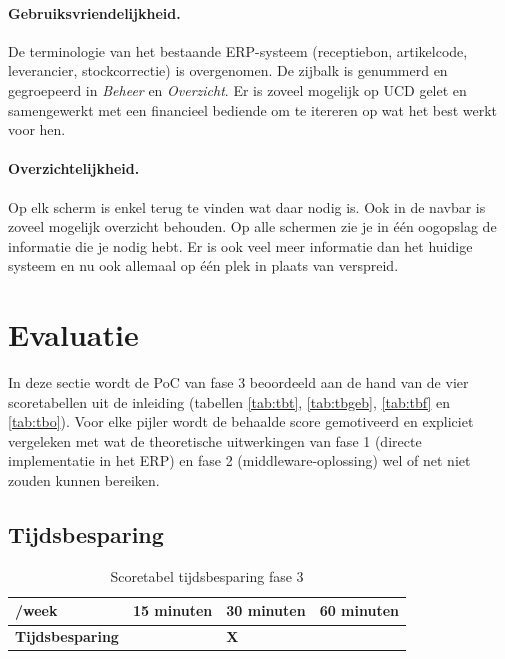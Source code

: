 \paragraph{Gebruiksvriendelijkheid.} De terminologie van het bestaande ERP-systeem (receptiebon, artikelcode, leverancier, stockcorrectie) is overgenomen. De zijbalk is genummerd en gegroepeerd in \textit{Beheer} en \textit{Overzicht}. Er is zoveel mogelijk op UCD gelet en samengewerkt met een financieel bediende om te itereren op wat het best werkt voor hen.

\paragraph{Overzichtelijkheid.} Op elk scherm is enkel terug te vinden wat daar nodig is. Ook in de navbar is zoveel mogelijk overzicht behouden. Op alle schermen zie je in één oogopslag de informatie die je nodig hebt. Er is ook veel meer informatie dan het huidige systeem en nu ook allemaal op één plek in plaats van verspreid.

\section{Evaluatie}

In deze sectie wordt de PoC van fase 3 beoordeeld aan de hand van de vier scoretabellen uit de inleiding (tabellen \ref{tab:tbt}, \ref{tab:tbgeb}, \ref{tab:tbf} en \ref{tab:tbo}). Voor elke pijler wordt de behaalde score gemotiveerd en expliciet vergeleken met wat de theoretische uitwerkingen van fase 1 (directe implementatie in het ERP) en fase 2 (middleware-oplossing) wel of net niet zouden kunnen bereiken.

\subsection{Tijdsbesparing}

\begin{table}[H]
    \centering
    \begin{tabular}{|p{4cm}|p{3cm}|p{3cm}|p{3cm}|}
        \hline
        /week & \textbf{15 minuten} & \textbf{30 minuten} & \textbf{60 minuten} \\
        \hline
        \textbf{Tijdsbesparing} &  & \textbf{X} &  \\
        \hline
    \end{tabular}
    \caption[Scoretabel tijdsbesparing fase 3]{\label{tab:tbt_f3}Scoretabel tijdsbesparing fase 3}
\end{table}

